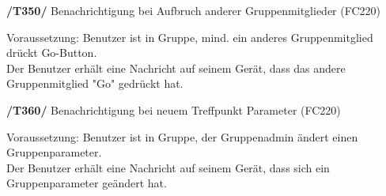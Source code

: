 \textbf{/T350/} Benachrichtigung bei Aufbruch anderer Gruppenmitglieder (FC220)\\
\begin{center}
\vspace{-\parskip}
\begin{minipage}[t]{0.9\textwidth}
Voraussetzung: Benutzer ist in Gruppe, mind. ein anderes Gruppenmitglied drückt Go-Button.\\
Der Benutzer erhält eine Nachricht auf seinem Gerät, dass das andere Gruppenmitglied "Go" gedrückt hat.\\
\end{minipage}
\end{center}

\textbf{/T360/} Benachrichtigung bei neuem Treffpunkt Parameter (FC220)\\
\begin{center}
\vspace{-\parskip}
\begin{minipage}[t]{0.9\textwidth}
Voraussetzung: Benutzer ist in Gruppe, der Gruppenadmin ändert einen Gruppenparameter.\\
Der Benutzer erhält eine Nachricht auf seinem Gerät, dass sich ein Gruppenparameter geändert hat.\\
\end{minipage}
\end{center}

